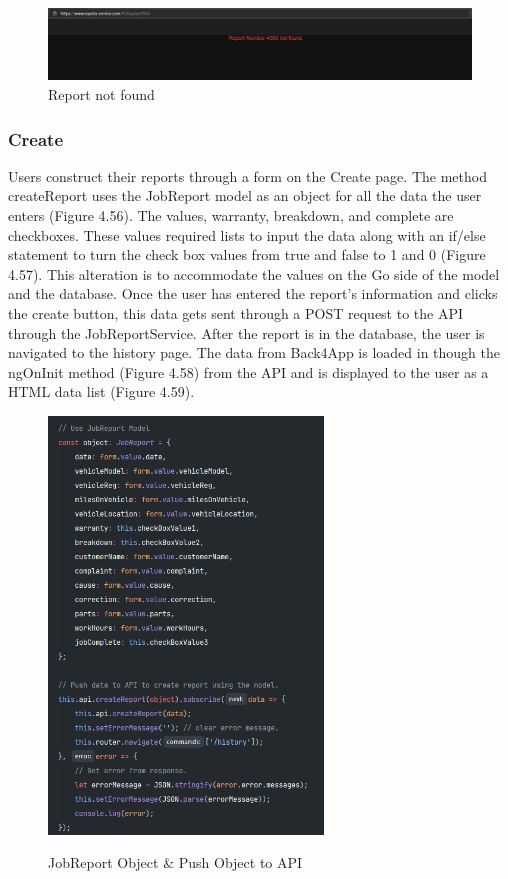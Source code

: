 \begin{figure}[H]
    \caption{Report not found}
    \label{image:ReportNotFound}
    \centering
    \includegraphics[width=1.0\textwidth]{images/repota/UI/report_not_found.png}
\end{figure}

\subsubsection{Create}
Users construct their reports through a form on the Create page. The method createReport uses the JobReport model as an object for all the data the user enters (Figure 4.56). The values, warranty, breakdown, and complete are checkboxes. These values required lists to input the data along with an if/else statement to turn the check box values from true and false to 1 and 0 (Figure 4.57). This alteration is to accommodate the values on the Go side of the model and the database. Once the user has entered the report's information and clicks the create button, this data gets sent through a POST request to the API through the JobReportService. After the report is in the database, the user is navigated to the history page. The data from Back4App is loaded in though the ngOnInit method (Figure 4.58) from the API and is displayed to the user as a HTML data list (Figure 4.59).  

\begin{figure}[H]
    \centering
    \caption{JobReport Object \& Push Object to API}
    \includegraphics[width=0.65\textwidth]{images/repota/report_pages/create_2.png}
    \label{image:createReportObject}
    \centering
\end{figure}

